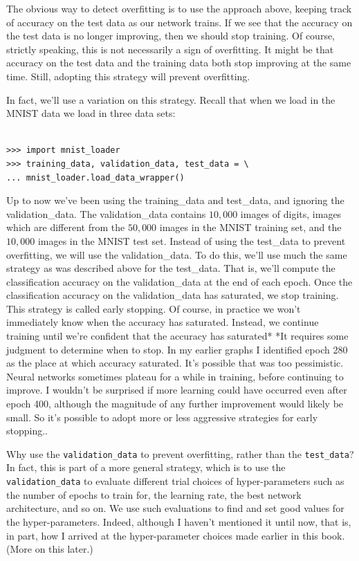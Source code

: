 The obvious way to detect overfitting is to use the approach above, keeping track of accuracy on the test data as our network trains. If we see that the accuracy on the test data is no longer improving, then we should stop training. Of course, strictly speaking, this is not necessarily a sign of overfitting. It might be that accuracy on the test data and the training data both stop improving at the same time. Still, adopting this strategy will prevent overfitting.


In fact, we'll use a variation on this strategy. Recall that when we load in the MNIST data we load in three data sets:



\begin{lstlisting}
 
>>> import mnist_loader 
>>> training_data, validation_data, test_data = \
... mnist_loader.load_data_wrapper()

\end{lstlisting}


Up to now we've been using the training\_\allowbreak{}data and test\_\allowbreak{}data, and ignoring the validation\_\allowbreak{}data. The validation\_\allowbreak{}data contains $10,000$ images of digits, images which are different from the $50,000$ images in the MNIST training set, and the $10,000$ images in the MNIST test set. Instead of using the test\_\allowbreak{}data to prevent overfitting, we will use the validation\_\allowbreak{}data. To do this, we'll use much the same strategy as was described above for the test\_\allowbreak{}data. That is, we'll compute the classification accuracy on the validation\_\allowbreak{}data at the end of each epoch. Once the classification accuracy on the validation\_\allowbreak{}data has saturated, we stop training. This strategy is called early stopping. Of course, in practice we won't immediately know when the accuracy has saturated. Instead, we continue training until we're confident that the accuracy has saturated* *It requires some judgment to determine when to stop. In my earlier graphs I identified epoch 280 as the place at which accuracy saturated. It's possible that was too pessimistic. Neural networks sometimes plateau for a while in training, before continuing to improve. I wouldn't be surprised if more learning could have occurred even after epoch 400, although the magnitude of any further improvement would likely be small. So it's possible to adopt more or less aggressive strategies for early stopping..


Why use the \texttt{validation\_\allowbreak{}data} to prevent overfitting, rather than the \texttt{test\_\allowbreak{}data}? In fact, this is part of a more general strategy, which is to use the \texttt{validation\_\allowbreak{}data} to evaluate different trial choices of hyper-parameters such as the number of epochs to train for, the learning rate, the best network architecture, and so on. We use such evaluations to find and set good values for the hyper-parameters. Indeed, although I haven't mentioned it until now, that is, in part, how I arrived at the hyper-parameter choices made earlier in this book. (More on this later.)


